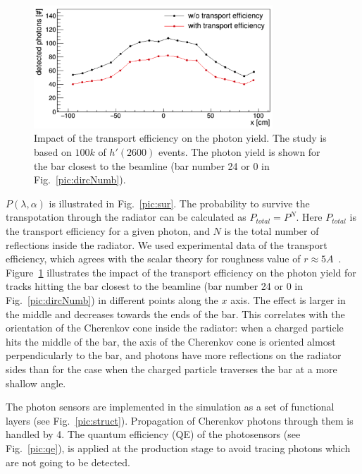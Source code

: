 \begin{figure}[!h]
\centering
\includegraphics[width=0.8\textwidth]{pics/transport.png}
\caption{\label{pic:tra}
Impact of the transport efficiency on the photon yield. The study is based on $100k$ of $h'(2600)$ events. The photon yield is shown for the bar closest to the beamline (bar number 24 or 0 in Fig.~\ref{pic:dircNumb}).
}
\end{figure}

$P(\lambda,\alpha)$ is illustrated in Fig.~\ref{pic:sur}. The probability to survive the transpotation through the radiator can be calculated as $P_{total} = P^{N}$. Here $P_{total}$ is the transport efficiency for a given photon, and $N$ is the total number of reflections inside the radiator. We used experimental data of the transport efficiency, which agrees with the scalar theory for roughness value of $r \approx 5 A$~\cite{roughness}. Figure~\ref{pic:tra} illustrates the impact of the transport efficiency on the photon yield for tracks hitting the bar closest to the beamline (bar number 24 or 0 in Fig.~\ref{pic:dircNumb}) in different points along the $x$ axis. The effect is larger in the middle and decreases towards the ends of the bar. This correlates with the orientation of the Cherenkov cone inside the radiator: when a charged particle hits the middle of the bar, the axis of the Cherenkov cone is oriented almost perpendicularly to the bar, and photons have more reflections on the radiator sides than for the case when the charged particle traverses the bar at a more shallow angle.

The photon sensors are implemented in the simulation as a set of functional layers (see Fig.~\ref{pic:struct}). Propagation of Cherenkov photons through them is handled by {\geant}4. The quantum efficiency (QE) of the photosensors (see Fig.~\ref{pic:qe}), is applied at the production stage to avoid tracing photons which are not going to be detected.

